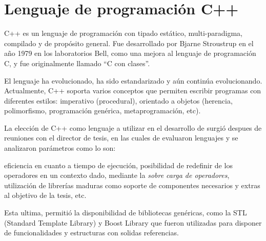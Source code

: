 \section{Lenguaje de programación C++}
C++ es un lenguaje de programación con tipado estático, multi-paradigma, compilado y de propósito general. Fue desarrollado por Bjarne Stroustrup en el año 1979 en los laboratorios Bell, como una mejora al lenguaje de programación C, y fue originalmente llamado ``C con clases''.

El lenguaje ha evolucionado, ha sido estandarizado y aún continúa evolucionando. Actualmente, C++ soporta varios conceptos que permiten escribir programas con diferentes estilos: imperativo (procedural), orientado a objetos (herencia, polimorfismo, programación genérica, metaprogramación, etc).

La elección de C++ como lenguaje a utilizar en el desarrollo de \maggen surgió despues de reuniones con el director de tesis, en las cuales de evaluaron lenguajes y se analizaron parámetros como lo son: 

eficiencia en cuanto a tiempo de ejecución, posibilidad de redefinir de los operadores en un contexto dado, mediante la \textit{sobre carga de operadores}, utilización de librerías maduras como soporte de componentes necesarios y extras al objetivo de la tesis, etc. 

Esta ultima, permitió la disponibilidad de bibliotecas genéricas, como la STL (Standard Template Library) y Boost Library que fueron utilizadas para disponer de funcionalidades y estructuras con solidas referencias.


